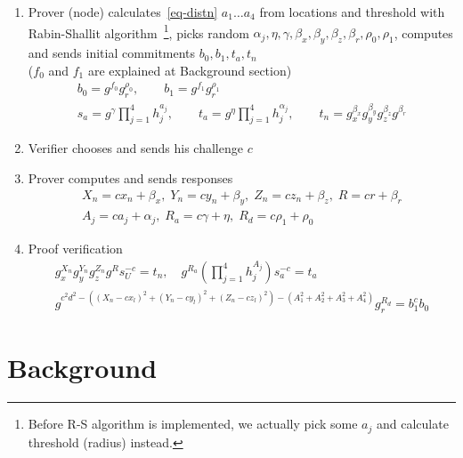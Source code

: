 \documentclass[a4paper,12pt]{article}
\begin{document}
\begin{enumerate}
\item
  Prover (node) calculates~\eqref{eq-distn} $a_1 \dots a_4$ from locations and threshold
  with Rabin-Shallit algorithm~\footnote{Before R-S algorithm is implemented,
  we actually pick some $a_j$ and calculate threshold (radius) instead.},
  picks random $\alpha_j, \eta, \gamma, \beta_x, \beta_y, \beta_z, \beta_r, \rho_0, \rho_1$, %
  computes and sends initial commitments $b_0, b_1, t_a, t_n$ \\
  ($f_0$ and $f_1$ are explained at Background section)
\begin{gather}
  b_0 = g^{f_0} g_r^{\rho_0},   \qquad
  b_1 = g^{f_1} g_r^{\rho_1}    \\
  s_a = g^{\gamma} \prod_{j=1}^4 h_j^{a_j},   \qquad
  t_a = g^{\eta} \prod_{j=1}^4 h_j^{\alpha_j} ,   \qquad
  t_n = g_x^{\beta_x} g_y^{\beta_y} g_z^{\beta_z} g^{\beta_r}
\end{gather}

\item
  Verifier chooses and sends his challenge $c$
\item
  Prover computes and sends responses
\begin{gather}
  X_n = c x_n + \beta_x,  \;
  Y_n = c y_n + \beta_y,  \;
  Z_n = c z_n + \beta_z,   \;
  R = c r + \beta_r   \\
  A_j = c a_j + \alpha_j, \;
  R_a = c \gamma + \eta,   \;
  R_d = c \rho_1 + \rho_0
\end{gather}

\item
  Proof verification
\begin{gather}
\label{verf-linear}
  g_x^{X_n} g_y^{Y_n} g_z^{Z_n} g^{R} s_U^{-c} = t_n, \quad
  g^{R_a} (\prod_{j=1}^4 h_j^{A_j}) s_a^{-c} = t_a \\
%
\label{verf-distn}
  g^{c^2 d^2 - ((X_n - c x_l)^2 + (Y_n - c y_l)^2 + (Z_n - c z_l)^2 ) - (A_1^2 + A_2^2 + A_3^2 + A_4^2)} g_r^{R_d} = b_1^{c} b_0
\end{gather}
  
\end{enumerate}

\section{Background}
\end{document}
